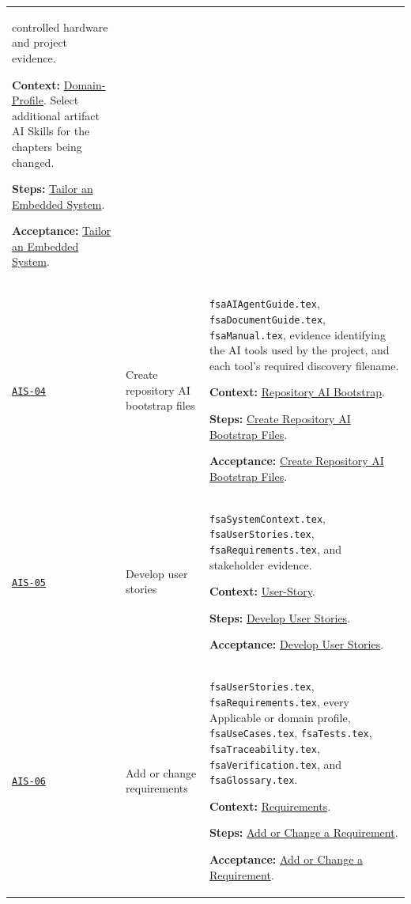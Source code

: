 \begin{tabularx}{\linewidth}{L{1.6cm}L{3.1cm}Y}
controlled hardware and project evidence.\par\textbf{Context:} \hyperref[Section:AIDomainContext]{Domain-Profile}. Select additional artifact AI Skills for the chapters being changed.\par\textbf{Steps:} \hyperref[Section:AIEmbeddedTaskSteps]{Tailor an Embedded System}.\par\textbf{Acceptance:} \hyperref[Section:AIEmbeddedAcceptance]{Tailor an Embedded System}.\\
\label{Skill:AIS-04}\hyperref[Section:AIBootstrapSteps]{\texttt{AIS-04}} & Create repository AI bootstrap files & \texttt{fsaAIAgentGuide.tex},
\texttt{fsaDocumentGuide.tex}, \texttt{fsaManual.tex}, evidence identifying the
AI tools used by the project, and each tool's required discovery filename.\par\textbf{Context:} \hyperref[Section:AIRepositoryBootstrap]{Repository AI Bootstrap}.\par\textbf{Steps:} \hyperref[Section:AIBootstrapTaskSteps]{Create Repository AI Bootstrap Files}.\par\textbf{Acceptance:} \hyperref[Section:AIBootstrapAcceptance]{Create Repository AI Bootstrap Files}.\\
\label{Skill:AIS-05}\hyperref[Section:AIStorySteps]{\texttt{AIS-05}} & Develop user stories & \texttt{fsaSystemContext.tex}, \texttt{fsaUserStories.tex}, \texttt{fsaRequirements.tex}, and stakeholder evidence.\par\textbf{Context:} \hyperref[Section:AIUserStoryContext]{User-Story}.\par\textbf{Steps:} \hyperref[Section:AIStoryTaskSteps]{Develop User Stories}.\par\textbf{Acceptance:} \hyperref[Section:AIStoryAcceptance]{Develop User Stories}.\\
\label{Skill:AIS-06}\hyperref[Section:AIRequirementSteps]{\texttt{AIS-06}} & Add or change requirements & \texttt{fsaUserStories.tex}, \texttt{fsaRequirements.tex}, every Applicable or \OwnedTBD{} domain profile, \texttt{fsaUseCases.tex}, \texttt{fsaTests.tex}, \texttt{fsaTraceability.tex}, \texttt{fsaVerification.tex}, and \texttt{fsaGlossary.tex}.\par\textbf{Context:} \hyperref[Section:AIRequirementsContext]{Requirements}.\par\textbf{Steps:} \hyperref[Section:AIRequirementTaskSteps]{Add or Change a Requirement}.\par\textbf{Acceptance:} \hyperref[Section:AIRequirementAcceptance]{Add or Change a Requirement}.\\

\end{tabularx}

